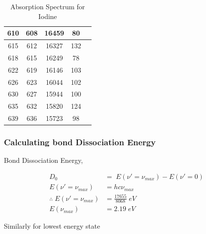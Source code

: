 \begin{table}[H]
\begin{tabular}{|c|c|c|c|c|}
        610                         & 608                     & 16459                                  & 80                                           \\ \hline
        615                         & 612                     & 16327                                  & 132                                          \\ \hline
        618                         & 615                     & 16249                                  & 78                                           \\ \hline
        622                         & 619                     & 16146                                  & 103                                          \\ \hline
        626                         & 623                     & 16044                                  & 102                                          \\ \hline
        630                         & 627                     & 15944                                  & 100                                          \\ \hline
        635                         & 632                     & 15820                                  & 124                                          \\ \hline
        639                         & 636                     & 15723                                  & 98                                           \\ \hline
    \end{tabular}
    \caption{Absorption Spectrum for Iodine}
    \label{tab:iodine}
    \end{table}

\subsubsection{Calculating bond Dissociation Energy}
    Bond Dissociation Energy, 
    
    \begin{align*}
        D_0&=\;E(\nu'=\nu_{max})-E(\nu'=0)\\
        E(\nu'=\nu_{max})&=hc\nu_{max}\\
        \therefore\;E(\nu'=\nu_{max})&=\frac{17655}{8068}\;eV\\
        E(\nu_{max})&=2.19\;eV
    \end{align*}

    Similarly for lowest energy state

